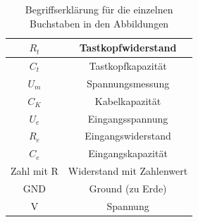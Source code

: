        \begin{table}[h!]
            \centering
            \caption{Begriffserklärung für die einzelnen Buchstaben in den Abbildungen}
            \begin{tabular}{|c|c|}
                \hline
                $R_t$ & Tastkopfwiderstand\\ \hline \hline
                $C_t$ & Tastkopfkapazität \\ \hline
                $U_m$ & Spannungsmessung\\ \hline
                $C_K$ & Kabelkapazität\\ \hline
                $U_e$ & Eingangsspannung\\ \hline
                $R_e$ & Eingangswiderstand\\ \hline
                $C_e$ & Eingangskapazität\\ \hline
                Zahl mit R & Widerstand mit Zahlenwert \\ \hline
                GND & Ground (zu Erde)\\ \hline
                V & Spannung\\ \hline
            \end{tabular}
        \end{table}

